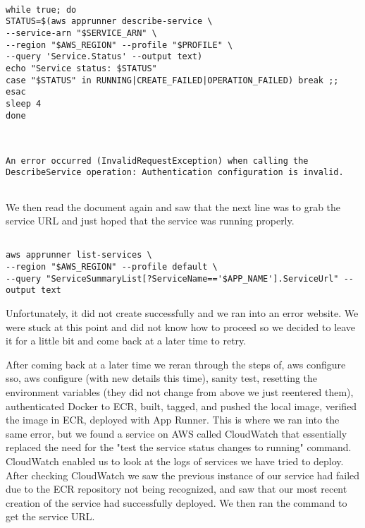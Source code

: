 \begin{verbatim}

while true; do
STATUS=$(aws apprunner describe-service \
--service-arn "$SERVICE_ARN" \
--region "$AWS_REGION" --profile "$PROFILE" \
--query 'Service.Status' --output text)
echo "Service status: $STATUS"
case "$STATUS" in RUNNING|CREATE_FAILED|OPERATION_FAILED) break ;; esac
sleep 4
done


\end{verbatim}

\begin{verbatim}

An error occurred (InvalidRequestException) when calling the DescribeService operation: Authentication configuration is invalid.


\end{verbatim}

\noindent We then read the document again and saw that the next line was to grab the service URL and just hoped that the service was running properly. 

\begin{verbatim}

aws apprunner list-services \
--region "$AWS_REGION" --profile default \
--query "ServiceSummaryList[?ServiceName=='$APP_NAME'].ServiceUrl" --output text

\end{verbatim}


\noindent Unfortunately, it did not create successfully and we ran into an error website. We were stuck at this point and did not know how to proceed so we decided to leave it for a little bit and come back at a later time to retry. \medskip

\noindent After coming back at a later time we reran through the steps of, aws configure sso, aws configure (with new details this time), sanity test, resetting the environment variables (they did not change from above we just reentered them), authenticated Docker to ECR, built, tagged, and pushed the local image, verified the image in ECR, deployed with App Runner. This is where we ran into the same error, but we found a service on AWS called CloudWatch that essentially replaced the need for the "test the service status changes to running" command. CloudWatch enabled us to look at the logs of services we have tried to deploy. After checking CloudWatch we saw the previous instance of our service had failed due to the ECR repository not being recognized, and saw that our most recent creation of the service had successfully deployed. We then ran the command to get the service URL.


